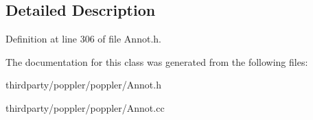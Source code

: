 \subsection{Detailed Description}


Definition at line 306 of file Annot.\+h.



The documentation for this class was generated from the following files\+:\begin{DoxyCompactItemize}
\item 
thirdparty/poppler/poppler/Annot.\+h\item 
thirdparty/poppler/poppler/Annot.\+cc\end{DoxyCompactItemize}
